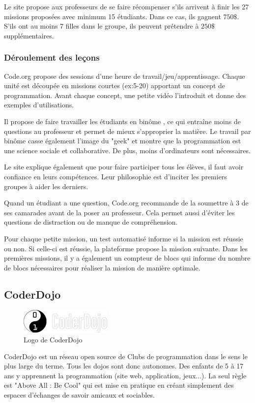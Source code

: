 Le site propose aux professeurs de se faire récompenser s'ils arrivent à finir les 27 \glspl{mission} proposées avec minimum 15 étudiants. Dans ce cas, ils gagnent $750\$$. S'ils ont au moins 7 filles dans le groupe, ils peuvent prétendre à $250\$$ supplémentaires.

\subsubsection{Déroulement des leçons}
Code.org propose des sessions d'une heure de travail/jeu/apprentissage. Chaque unité est découpée en \glspl{mission} courtes (ex:5-20) apportant un concept de programmation. Avant chaque concept, une petite vidéo l'introduit et donne des exemples d'utilisations.

Il propose de faire travailler les étudiants en binôme \cite{wiki-pair-prog}, ce qui entraîne moins de questions au professeur et permet de mieux s'approprier la matière. Le travail par binôme casse également l'image du "geek" et montre que la programmation est une science sociale et collaborative. De plus, moins d'ordinateurs sont nécessaires.

Le site explique également que pour faire participer tous les élèves, il faut avoir confiance en leurs compétences. Leur philosophie est d'inciter les premiers groupes à aider les derniers.

Quand un étudiant a une question, Code.org recommande de la soumettre à 3 de ses camarades avant de la poser au professeur. Cela permet aussi d'éviter les questions de distraction ou de manque de compréhension.

Pour chaque petite \gls{mission}, un test automatisé informe si la \gls{mission} est réussie ou non. Si celle-ci est réussie, la plateforme propose la \gls{mission} suivante. Dans les premières \glspl{mission}, il y a également un compteur de \glspl{bloc} qui informe du nombre de \glspl{bloc} nécessaires pour réaliser la \gls{mission} de manière optimale.

\subsection{CoderDojo}
\begin{figure}[!ht]
  \begin{center}
    \includegraphics[scale=0.5]{content/5-related_work/images/dojo}
    \caption{Logo de CoderDojo}
    \label{fig:coder dojo}
  \end{center}
\end{figure}
CoderDojo \cite{dojo-about} est un réseau open source de Clubs de programmation dans le sens le plus large du terme. Tous les dojos sont donc autonomes. Des enfants de 5 à 17 ans y apprennent la programmation (site web, application, jeux...). La seul règle est "Above All : Be Cool" qui est mise en pratique en créant simplement des espaces d'échanges de savoir amicaux et sociables.

